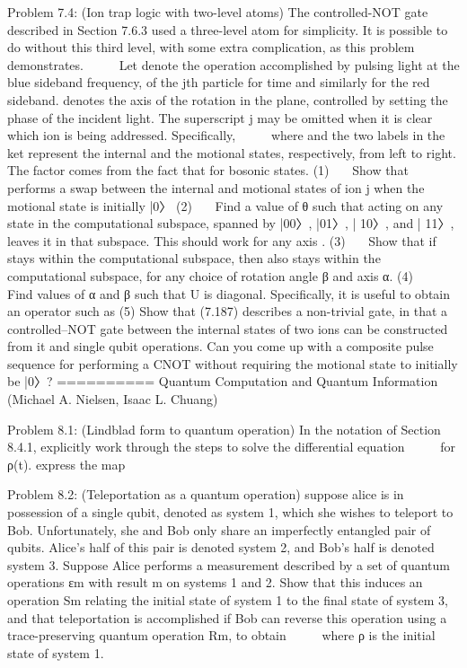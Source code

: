 \documentclass{article}
\newcommand{\0}{{$|0\rangle$}}
\newcommand{\1}{{$|1\rangle$}}
\newcommand{\2}{\frac{1}{\sqrt{2}}}
\begin{document}
Problem 7.4: (Ion trap logic with two-level atoms) The controlled-NOT gate described in Section 7.6.3 used a three-level atom for simplicity. It is possible to do without this third level, with some extra complication, as this problem demonstrates.      Let denote the operation accomplished by pulsing light at the blue sideband frequency, of the jth particle for time and similarly for the red sideband. denotes the axis of the rotation in the plane, controlled by setting the phase of the incident light. The superscript j may be omitted when it is clear which ion is being addressed. Specifically,      where and the two labels in the ket represent the internal and the motional states, respectively, from left to right. The factor comes from the fact that for bosonic states. (1)    Show that performs a swap between the internal and motional states of ion j when the motional state is initially |0〉 (2)    Find a value of θ such that acting on any state in the computational subspace, spanned by |00〉, |01〉, | 10〉, and | 11〉, leaves it in that subspace. This should work for any axis . (3)    Show that if stays within the computational subspace, then also stays within the computational subspace, for any choice of rotation angle β and axis α. (4)    Find values of α and β such that U is diagonal. Specifically, it is useful to obtain an operator such as (5) Show that (7.187) describes a non-trivial gate, in that a controlled–NOT gate between the internal states of two ions can be constructed from it and single qubit operations. Can you come up with a composite pulse sequence for performing a CNOT without requiring the motional state to initially be |0〉?
==========
Quantum Computation and Quantum Information (Michael A. Nielsen, Isaac L. Chuang)

Problem 8.1: (Lindblad form to quantum operation) In the notation of Section 8.4.1, explicitly work through the steps to solve the differential equation      for ρ(t). express the map

Problem 8.2: (Teleportation as a quantum operation) suppose alice is in possession of a single qubit, denoted as system 1, which she wishes to teleport to Bob. Unfortunately, she and Bob only share an imperfectly entangled pair of qubits. Alice’s half of this pair is denoted system 2, and Bob’s half is denoted system 3. Suppose Alice performs a measurement described by a set of quantum operations εm with result m on systems 1 and 2. Show that this induces an operation Sm relating the initial state of system 1 to the final state of system 3, and that teleportation is accomplished if Bob can reverse this operation using a trace-preserving quantum operation Rm, to obtain      where ρ is the initial state of system 1.
\end{document}
